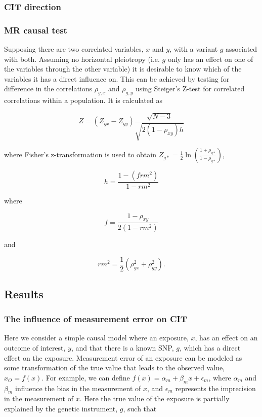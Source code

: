 \documentclass[]{article}
\begin{document}
\subsubsection{CIT direction}\label{cit-direction}

\subsubsection{MR causal test}\label{mr-causal-test}

Supposing there are two correlated variables, \(x\) and \(y\), with a
variant \(g\) associated with both. Assuming no horizontal pleiotropy
(i.e. \(g\) only has an effect on one of the variables through the other
variable) it is desirable to know which of the variables it has a direct
influence on. This can be achieved by testing for difference in the
correlations \(\rho_{g, x}\) and \(\rho_{g, y}\) using Steiger's Z-test
for correlated correlations within a population. It is calculated as

\[
Z = (Z_{gx} - Z_{gy}) \frac{\sqrt{N-3}}{\sqrt{2(1-\rho_{xy})h}}
\]

where Fisher's z-transformation is used to obtain
\(Z_{g*} = \frac{1}{2} \ln \left ( \frac{1+\rho_{g*}}{1-\rho_{g*}} \right )\),

\[
h = \frac{1 - (frm^2)} {1 - rm^2}
\]

where

\[
f = \frac{1 - \rho_{xy}}{2(1 - rm^2)}
\]

and

\[
rm^2 = \frac{1}{2}(\rho_{gx}^2 + \rho_{gy}^2).
\]

\subsection{Results}\label{results}

\subsubsection{The influence of measurement error on
CIT}\label{the-influence-of-measurement-error-on-cit}

Here we consider a simple causal model where an exposure, \(x\), has an
effect on an outcome of interest, \(y\), and that there is a known SNP,
\(g\), which has a direct effect on the exposure. Measurement error of
an exposure can be modeled as some transformation of the true value that
leads to the observed value, \(x_O=f(x)\). For example, we can define
\(f(x) = \alpha_m + \beta_m x + \epsilon_m\), where \(\alpha_m\) and
\(\beta_m\) influence the bias in the measurement of \(x\), and
\(\epsilon_m\) represents the imprecision in the measurement of \(x\).
Here the true value of the exposure is partially explained by the
genetic instrument, \(g\), such that
\end{document}
